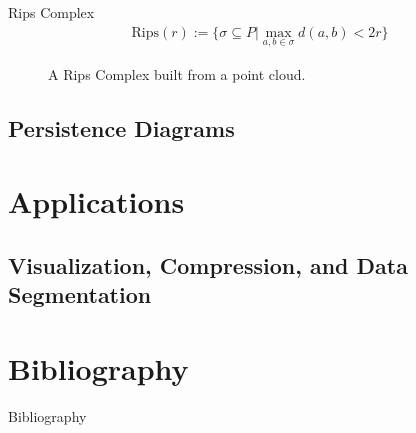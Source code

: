 \begin{frame}
	\begin{block}{Rips Complex}
		\begin{align*}
			\text{Rips}(r) := \{ \sigma \subseteq P
				| \max_{a,b \in \sigma} d(a,b) < 2r \}
		\end{align*}
		\cite{wagner}
	\end{block}
	\begin{figure}
		
		\caption{A Rips Complex built from a point cloud.}
	\end{figure}
\end{frame}

\subsection{Persistence Diagrams}
\begin{frame}
\end{frame}

\section{Applications}
\subsection{Visualization, Compression, and Data Segmentation}
\begin{frame}
\end{frame}

\section*{Bibliography}
\begin{frame}{Bibliography}
	\nocite{wagner}
	\nocite{hatcher}
	\nocite{fraleigha}
	\begingroup
	\renewcommand{\section}[2]{}%
	
	\endgroup
\end{frame}





